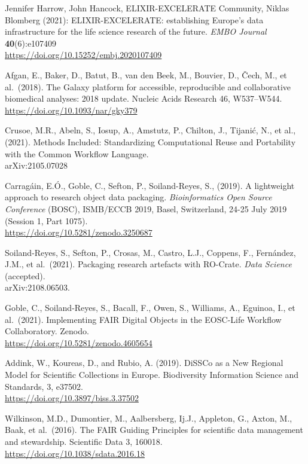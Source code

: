 \begin{thebibliography}{9}
Jennifer Harrow, John Hancock, ELIXIR-EXCELERATE Community,
Niklas Blomberg (2021): ELIXIR-EXCELERATE: establishing Europe's data
infrastructure for the life science research of the future. \emph{EMBO
Journal} \textbf{40}(6):e107409\\
\url{https://doi.org/10.15252/embj.2020107409}

Afgan, E., Baker, D., Batut, B., van den Beek, M., Bouvier, D.,
Čech, M., et al.~(2018). The Galaxy platform for accessible,
reproducible and collaborative biomedical analyses: 2018 update. Nucleic
Acids Research 46, W537--W544.\\
\url{https://doi.org/10.1093/nar/gky379}

Crusoe, M.R., Abeln, S., Iosup, A., Amstutz, P., Chilton, J.,
Tijanić, N., et al., (2021). Methods Included: Standardizing
Computational Reuse and Portability with the Common Workflow Language.\\
arXiv:2105.07028

Carragáin, E.Ó., Goble, C., Sefton, P., Soiland-Reyes, S.,
(2019). A lightweight approach to research object data packaging.
\emph{Bioinformatics Open Source Conference} (BOSC), ISMB/ECCB 2019,
Basel, Switzerland, 24-25 July 2019 (Session 1, Part 1075).\\
\url{https://doi.org/10.5281/zenodo.3250687}

Soiland-Reyes, S., Sefton, P., Crosas, M., Castro, L.J.,
Coppens, F., Fernández, J.M., et al.~(2021). Packaging research
artefacts with RO-Crate. \emph{Data Science} (accepted).\\
arXiv:2108.06503.

Goble, C., Soiland-Reyes, S., Bacall, F., Owen, S., Williams,
A., Eguinoa, I., et al.~(2021). Implementing FAIR Digital Objects in the
EOSC-Life Workflow Collaboratory. Zenodo.\\
\url{https://doi.org/10.5281/zenodo.4605654}

Addink, W., Koureas, D., and Rubio, A. (2019). DiSSCo as a New
Regional Model for Scientific Collections in Europe. Biodiversity
Information Science and Standards, 3, e37502.\\
\url{https://doi.org/10.3897/biss.3.37502}

Wilkinson, M.D., Dumontier, M., Aalbersberg, Ij.J., Appleton,
G., Axton, M., Baak, et al.~(2016). The FAIR Guiding Principles for
scientific data management and stewardship. Scientific Data 3, 160018.\\
\url{https://doi.org/10.1038/sdata.2016.18}


\end{thebibliography}
